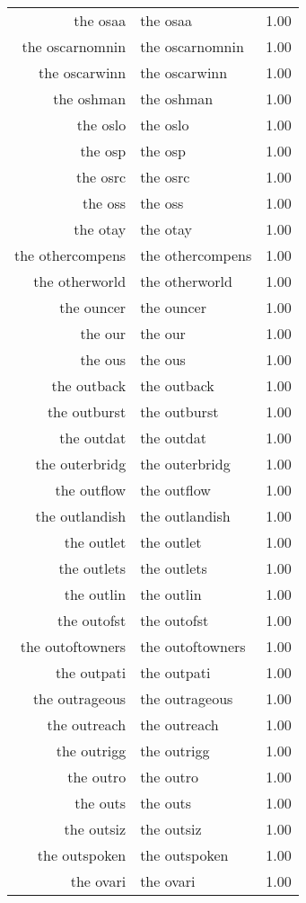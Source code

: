 \begin{table}[ht]
\begin{tabular}{rlr}
  the osaa & the osaa & 1.00 \\ 
  the oscarnomnin & the oscarnomnin & 1.00 \\ 
  the oscarwinn & the oscarwinn & 1.00 \\ 
  the oshman & the oshman & 1.00 \\ 
  the oslo & the oslo & 1.00 \\ 
  the osp & the osp & 1.00 \\ 
  the osrc & the osrc & 1.00 \\ 
  the oss & the oss & 1.00 \\ 
  the otay & the otay & 1.00 \\ 
  the othercompens & the othercompens & 1.00 \\ 
  the otherworld & the otherworld & 1.00 \\ 
  the ouncer & the ouncer & 1.00 \\ 
  the our & the our & 1.00 \\ 
  the ous & the ous & 1.00 \\ 
  the outback & the outback & 1.00 \\ 
  the outburst & the outburst & 1.00 \\ 
  the outdat & the outdat & 1.00 \\ 
  the outerbridg & the outerbridg & 1.00 \\ 
  the outflow & the outflow & 1.00 \\ 
  the outlandish & the outlandish & 1.00 \\ 
  the outlet & the outlet & 1.00 \\ 
  the outlets & the outlets & 1.00 \\ 
  the outlin & the outlin & 1.00 \\ 
  the outofst & the outofst & 1.00 \\ 
  the outoftowners & the outoftowners & 1.00 \\ 
  the outpati & the outpati & 1.00 \\ 
  the outrageous & the outrageous & 1.00 \\ 
  the outreach & the outreach & 1.00 \\ 
  the outrigg & the outrigg & 1.00 \\ 
  the outro & the outro & 1.00 \\ 
  the outs & the outs & 1.00 \\ 
  the outsiz & the outsiz & 1.00 \\ 
  the outspoken & the outspoken & 1.00 \\ 
  the ovari & the ovari & 1.00 \\ 

\end{tabular}
\end{table}
